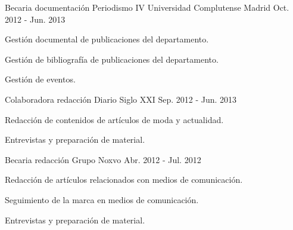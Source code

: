 \begin{cventries}
  \cventry
    {Becaria documentación Periodismo IV} %
    {Universidad Complutense Madrid} %
    {} %
    {Oct. 2012 - Jun. 2013} %
    {
      \begin{cvitems} %
        \item {Gestión documental de publicaciones del departamento.}
        \item {Gestión de bibliografía de publicaciones del departamento.}
        \item {Gestión de eventos.}
      \end{cvitems}
    }

  \cventry
    {Colaboradora redacción} %
    {Diario Siglo XXI} %
    {} %
    {Sep. 2012 - Jun. 2013} %
    {
      \begin{cvitems} %
        \item {Redacción de contenidos de artículos de moda y actualidad.}
        \item {Entrevistas y preparación de material.}
      \end{cvitems}
    }

  \cventry
    {Becaria redacción} %
    {Grupo Noxvo} %
    {} %
    {Abr. 2012 - Jul. 2012} %
    {
      \begin{cvitems} %
        \item {Redacción de artículos relacionados con medios de comunicación.}
        \item {Seguimiento de la marca en medios de comunicación.}
        \item {Entrevistas y preparación de material.}
      \end{cvitems}
    }

\end{cventries}
